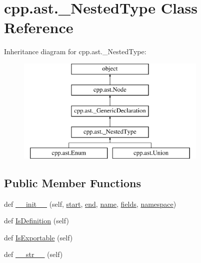 \hypertarget{classcpp_1_1ast_1_1__NestedType}{}\section{cpp.\+ast.\+\_\+\+Nested\+Type Class Reference}
\label{classcpp_1_1ast_1_1__NestedType}
Inheritance diagram for cpp.\+ast.\+\_\+\+Nested\+Type\+:\begin{figure}[H]
\begin{center}
\leavevmode
\includegraphics[height=5.000000cm]{classcpp_1_1ast_1_1__NestedType}
\end{center}
\end{figure}
\subsection*{Public Member Functions}
\begin{DoxyCompactItemize}
\item 
def \mbox{\hyperlink{classcpp_1_1ast_1_1__NestedType_a63acff60f38885be6cc11231fffc3f4e}{\+\_\+\+\_\+init\+\_\+\+\_\+}} (self, \mbox{\hyperlink{classcpp_1_1ast_1_1Node_a7b2aa97e6a049bb1a93aea48c48f1f44}{start}}, \mbox{\hyperlink{classcpp_1_1ast_1_1Node_a3c5e5246ccf619df28eca02e29d69647}{end}}, \mbox{\hyperlink{classcpp_1_1ast_1_1__GenericDeclaration_af774f4729dfd78d0538a6782fe8514c1}{name}}, \mbox{\hyperlink{classcpp_1_1ast_1_1__NestedType_aed69c37a409b4d26e6cfde2de3185d86}{fields}}, \mbox{\hyperlink{classcpp_1_1ast_1_1__GenericDeclaration_a8aee3f11b37449d54b42a78e0a689f46}{namespace}})
\item 
def \mbox{\hyperlink{classcpp_1_1ast_1_1__NestedType_a9f160999863f39c9032f60b014e213d5}{Is\+Definition}} (self)
\item 
def \mbox{\hyperlink{classcpp_1_1ast_1_1__NestedType_a689f8b0dc20e6070938825eee483dd2f}{Is\+Exportable}} (self)
\item 
def \mbox{\hyperlink{classcpp_1_1ast_1_1__NestedType_a18901ec6acba88c526d703444bf4d52c}{\+\_\+\+\_\+str\+\_\+\+\_\+}} (self)
\end{DoxyCompactItemize}

